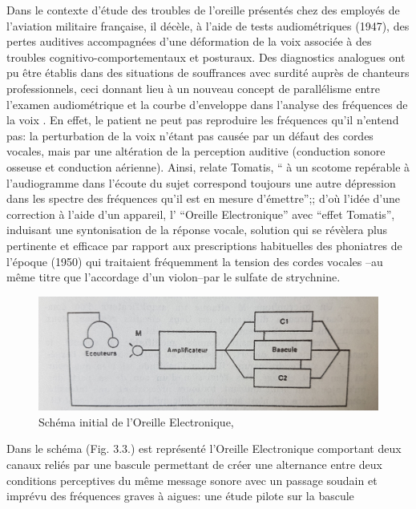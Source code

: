   Dans le contexte d'étude des troubles de
l'oreille présentés chez des employés de l'aviation militaire
française, il décèle, à l'aide
de tests audiométriques
 (1947), des pertes auditives accompagnées d'une
déformation de la voix associée à des troubles
cognitivo-comportementaux et posturaux. %
Des diagnostics analogues ont pu être établis dans des situations
de souffrances avec surdité auprès de chanteurs professionnels,
ceci donnant lieu
à un nouveau concept de
parallélisme entre l'examen audiométrique et la courbe
d'enveloppe dans l'analyse des fréquences de la voix \autocite {tomatisoreilletvie}.
En effet, le patient ne peut pas reproduire les fréquences qu'il
n'entend pas:
la perturbation de la voix n'étant pas causée par un défaut des cordes
vocales, mais par une altération de la perception auditive (conduction
sonore osseuse et conduction aérienne). Ainsi, relate Tomatis, \enquote{ à un scotome repérable à 
l'audiogramme dans l'écoute du sujet correspond toujours une autre dépression dans les spectre des 
fréquences qu'il est en mesure d'émettre};\autocite [75] {tomatisoreilletvie}; d'où
l'idée d'une correction à l'aide d'un appareil, l' ``Oreille
Electronique'' avec ``effet Tomatis'', induisant
une syntonisation de la réponse vocale, solution qui se révèlera plus pertinente et efficace par rapport aux prescriptions habituelles des phoniatres de
l'époque (1950) qui traitaient fréquemment la tension des cordes vocales --au même titre que
l'accordage d'un violon--par le sulfate de
strychnine\autocite {tomatisoreilletvie}.
	\\
\begin{figure}[h]
	\centering
	\includegraphics[width=0.7\linewidth]{images/oreilleelectro.jpg}
	\caption[L'Oreille
	Electronique: schéma]{Schéma initial de l'Oreille
		Electronique,\autocite[p.~97] {tomatisoreilletvie}}
	\label{oreilleelectro}
\end{figure}
Dans le schéma (Fig. 3.3.) est représenté l'Oreille Electronique
comportant deux canaux reliés par une
bascule permettant de créer une alternance entre deux conditions perceptives du même message sonore 
avec un passage soudain et imprévu des fréquences graves à aigues: une étude pilote sur la bascule 
